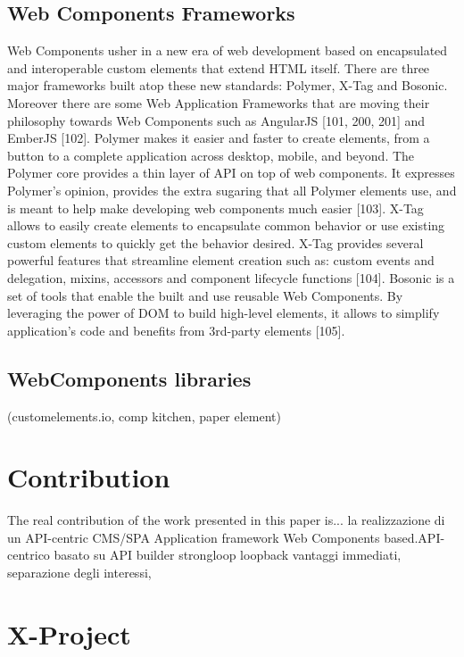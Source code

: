 \documentclass{sig-alternate}
\begin{document}
\subsection{Web Components Frameworks}

Web Components usher in a new era of web development based on encapsulated and interoperable custom elements that extend HTML itself.
There are three major frameworks built atop these new standards: Polymer, X-Tag and Bosonic.
Moreover there are some Web Application Frameworks that are moving their philosophy towards Web Components such as AngularJS [101, 200, 201] and EmberJS [102].
Polymer makes it easier and faster to create elements, from a button to a complete application across desktop, mobile, and beyond. The Polymer core provides a thin layer of API on top of web components. It expresses Polymer's opinion, provides the extra sugaring that all Polymer elements use, and is meant to help make developing web components much easier [103].
X-Tag allows to easily create elements to encapsulate common behavior or use existing custom elements to quickly get the behavior desired. X-Tag provides several powerful features that streamline element creation such as: custom events and delegation, mixins, accessors and component lifecycle functions [104].
Bosonic is a set of tools that enable the built and use reusable Web Components. By leveraging the power of DOM to build high-level elements, it allows to simplify application's code and benefits from 3rd-party elements [105].

\subsection{WebComponents libraries}

(customelements.io, comp kitchen, paper element)

\section{Contribution}

The real contribution of the work presented in this paper is...
la realizzazione di un API-centric CMS/SPA Application framework Web Components based.API-centrico basato su API builder strongloop loopback vantaggi immediati, separazione degli interessi, 

\section{X-Project}
\end{document}
